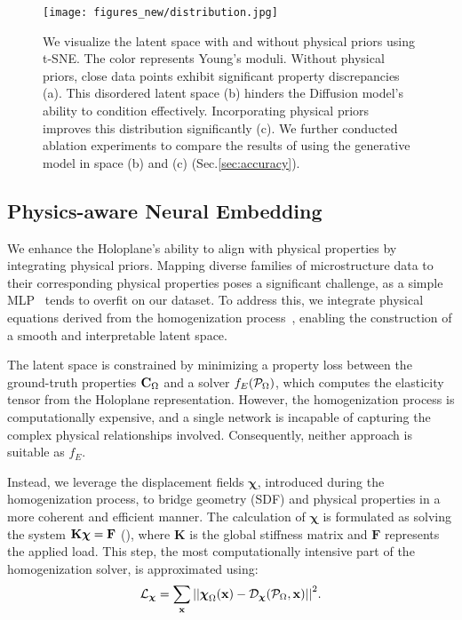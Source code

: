 \begin{figure}[tb]
    \texttt{[image: figures\_new/distribution.jpg]}
    \caption{We visualize the latent space with and without physical priors using t-SNE. The color represents Young's moduli.
    Without physical priors, close data points exhibit significant property discrepancies (a).
    This disordered latent space (b) hinders the Diffusion model's ability to condition effectively.
    Incorporating physical priors improves this distribution significantly (c).
    We further conducted ablation experiments to compare the results of using the generative model in space (b) and (c) (Sec.\ref{sec:accuracy}).}
	\label{fig:distribution}
\end{figure}

\subsection{Physics-aware Neural Embedding}
\label{sec:phy_enc}
We enhance the Holoplane's ability to align with physical properties by integrating physical priors. 
Mapping diverse families of microstructure data to their corresponding physical properties poses a significant challenge, as a simple MLP~\cite{Zheng2023} tends to overfit on our dataset.
To address this, we integrate physical equations derived from the homogenization process~\cite{andreassen2014Design, dong2018149}, enabling the construction of a smooth and interpretable latent space.

The latent space is constrained by minimizing a property loss between the ground-truth properties $\mathbf{C}_\Omega$ and a solver $f_{E}(\mathcal{P}_\Omega)$, which computes the elasticity tensor from the Holoplane representation. 
However, the homogenization process is computationally expensive, and a single network is incapable of capturing the complex physical relationships involved.
Consequently, neither approach is suitable as $f_{E}$. 

Instead, we leverage the displacement fields $\boldsymbol{\chi}$, introduced during the homogenization process, to bridge geometry (SDF) and physical properties in a more coherent and efficient manner.
The calculation of $\boldsymbol{\chi}$ is formulated as solving the system $\mathbf{K} \boldsymbol{\chi} = \mathbf{F}$ (\srefhomo), where $\mathbf{K}$ is the global stiffness matrix and $\mathbf{F}$ represents the applied load.
This step, the most computationally intensive part of the homogenization solver, is approximated using:
\begin{equation}
\label{eq:disp}
    \mathcal{L}_{\boldsymbol{\chi}}=\sum_{\mathbf{x}}{\left|\left|{\boldsymbol{\chi}_{\Omega}}(\mathbf{x}) - \mathcal{D}_{\boldsymbol{\chi}}(\mathcal{P}_{\Omega}, \mathbf{x})\right|\right|}^2.
\end{equation}

